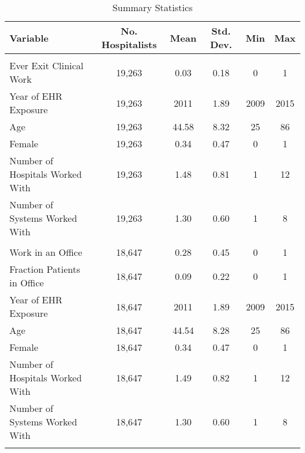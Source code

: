\begin{table}[h]
\small
\caption{Summary Statistics}
\centering
\begin{tabular}[t]{lccccc}
\toprule
Variable & No. Hospitalists & Mean & Std. Dev. & Min & Max\\
\midrule
\addlinespace[0.3em]
\multicolumn{6}{l}{\textbf{Exit Sample}}\\
\addlinespace[0.3em]
\hspace{1em}Ever Exit Clinical Work & 19,263 & 0.03 & 0.18 & 0 & 1\\
\addlinespace[0.3em]
\hspace{1em}Year of EHR Exposure & 19,263 & 2011 & 1.89 & 2009 & 2015\\
\addlinespace[0.3em]
\hspace{1em}Age & 19,263 & 44.58 & 8.32 & 25 & 86\\
\hspace{1em}Female & 19,263 & 0.34 & 0.47 & 0 & 1\\
\hspace{1em}Number of Hospitals Worked With & 19,263 & 1.48 & 0.81 & 1 & 12\\
\hspace{1em}Number of Systems Worked With & 19,263 & 1.30 & 0.60 & 1 & 8\\
\addlinespace[0.3em]
\multicolumn{6}{l}{\textbf{Office Setting Sample}}\\
\addlinespace[0.3em]
\hspace{1em}Work in an Office & 18,647 & 0.28 & 0.45 & 0 & 1\\
\hspace{1em}Fraction Patients in Office & 18,647 & 0.09 & 0.22 & 0 & 1\\
\addlinespace[0.3em]
\hspace{1em}Year of EHR Exposure & 18,647 & 2011 & 1.89 & 2009 & 2015\\
\addlinespace[0.3em]
\hspace{1em}Age & 18,647 & 44.54 & 8.28 & 25 & 86\\
\hspace{1em}Female & 18,647 & 0.34 & 0.47 & 0 & 1\\
\hspace{1em}Number of Hospitals Worked With & 18,647 & 1.49 & 0.82 & 1 & 12\\
\hspace{1em}Number of Systems Worked With & 18,647 & 1.30 & 0.60 & 1 & 8\\
\addlinespace[0.3em]
\multicolumn{6}{l}{\textbf{Productivity Sample}}\\

\end{tabular}
\end{table}
